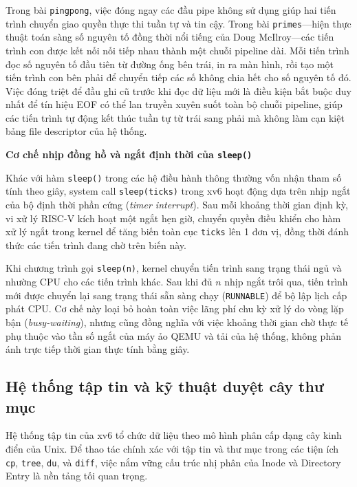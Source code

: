 \documentclass[12pt,a4paper]{article}
\begin{document}
Trong bài \texttt{pingpong}, việc đóng ngay các đầu pipe không sử dụng giúp hai tiến trình chuyển giao quyền thực thi tuần tự và tin cậy. Trong bài \texttt{primes}---hiện thực thuật toán sàng số nguyên tố đồng thời nổi tiếng của Doug McIlroy---các tiến trình con được kết nối nối tiếp nhau thành một chuỗi pipeline dài. Mỗi tiến trình đọc số nguyên tố đầu tiên từ đường ống bên trái, in ra màn hình, rồi tạo một tiến trình con bên phải để chuyển tiếp các số không chia hết cho số nguyên tố đó. Việc đóng triệt để đầu ghi cũ trước khi đọc dữ liệu mới là điều kiện bắt buộc duy nhất để tín hiệu EOF có thể lan truyền xuyên suốt toàn bộ chuỗi pipeline, giúp các tiến trình tự động kết thúc tuần tự từ trái sang phải mà không làm cạn kiệt bảng file descriptor của hệ thống.

\textbf{Cơ chế nhịp đồng hồ và ngắt định thời của \texttt{sleep()}}

Khác với hàm \texttt{sleep()} trong các hệ điều hành thông thường vốn nhận tham số tính theo giây, system call \texttt{sleep(ticks)} trong xv6 hoạt động dựa trên nhịp ngắt của bộ định thời phần cứng (\textit{timer interrupt}). Sau mỗi khoảng thời gian định kỳ, vi xử lý RISC-V kích hoạt một ngắt hẹn giờ, chuyển quyền điều khiển cho hàm xử lý ngắt trong kernel để tăng biến toàn cục \texttt{ticks} lên 1 đơn vị, đồng thời đánh thức các tiến trình đang chờ trên biến này.

Khi chương trình gọi \texttt{sleep(n)}, kernel chuyển tiến trình sang trạng thái ngủ và nhường CPU cho các tiến trình khác. Sau khi đủ $n$ nhịp ngắt trôi qua, tiến trình mới được chuyển lại sang trạng thái sẵn sàng chạy (\texttt{RUNNABLE}) để bộ lập lịch cấp phát CPU. Cơ chế này loại bỏ hoàn toàn việc lãng phí chu kỳ xử lý do vòng lặp bận (\textit{busy-waiting}), nhưng cũng đồng nghĩa với việc khoảng thời gian chờ thực tế phụ thuộc vào tần số ngắt của máy ảo QEMU và tải của hệ thống, không phản ánh trực tiếp thời gian thực tính bằng giây.

\subsection{Hệ thống tập tin và kỹ thuật duyệt cây thư mục}

Hệ thống tập tin của xv6 tổ chức dữ liệu theo mô hình phân cấp dạng cây kinh điển của Unix. Để thao tác chính xác với tập tin và thư mục trong các tiện ích \texttt{cp}, \texttt{tree}, \texttt{du}, và \texttt{diff}, việc nắm vững cấu trúc nhị phân của Inode và Directory Entry là nền tảng tối quan trọng.
\end{document}
